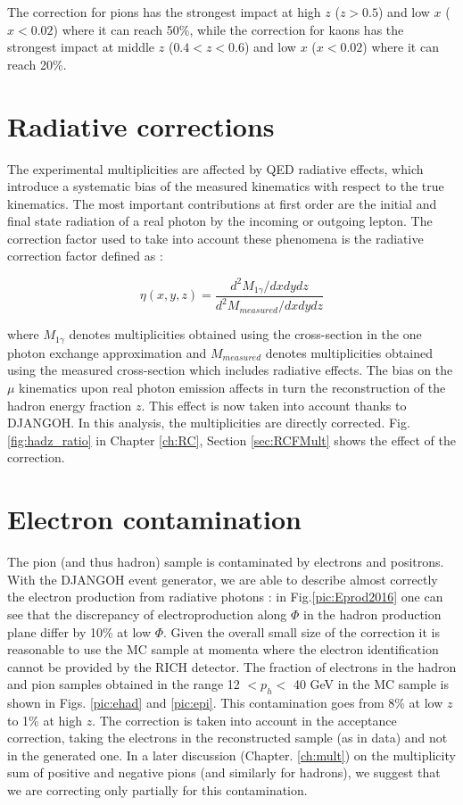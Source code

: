 The correction for pions has the strongest impact at high $z$ ($z>0.5$) and low $x$ ($x<0.02$) where it can reach 50\%, while the correction for kaons has the strongest impact at middle $z$ ($0.4<z<0.6$) and low $x$ ($x<0.02$) where it can reach 20\%.

\section{Radiative corrections} \label{sec:rcf}

The experimental multiplicities are affected by QED radiative effects, which introduce a systematic bias of the measured kinematics with respect to the true kinematics. The most important contributions at first order are the initial and final state radiation of a real photon by the incoming or outgoing lepton. The correction factor used to take into account these phenomena is the radiative correction factor defined as :

\begin{equation}
	\eta(x,y,z) = \frac{d^2 M_{1\gamma}/dxdydz}{d^2 M_{measured}/dxdydz}
\end{equation}

where $M_{1\gamma}$ denotes multiplicities obtained using the cross-section in the one photon exchange approximation and $M_{measured}$ denotes multiplicities obtained using the measured cross-section which includes radiative effects. The bias on the $\mu$ kinematics upon real photon emission affects in turn the reconstruction of the hadron energy fraction $z$. This effect is now taken into account thanks to DJANGOH. In this analysis, the multiplicities are directly corrected. Fig.\ref{fig:hadz_ratio} in Chapter \ref{ch:RC}, Section \ref{sec:RCFMult} shows the effect of the correction.

\section{Electron contamination}

The pion (and thus hadron) sample is contaminated by electrons and positrons. With the DJANGOH event generator, we are able to describe almost correctly the electron production from radiative photons : in Fig.\ref{pic:Eprod2016} one can see that the discrepancy of electroproduction along $\Phi$ in the hadron production plane differ by 10\% at low $\Phi$. Given the overall small size of the correction it is reasonable to use the MC sample at momenta where the electron identification cannot be provided by the RICH detector. The fraction of electrons in the hadron and pion samples obtained in the range 12 $< p_h <$ 40 GeV in the MC sample is shown in Figs. \ref{pic:ehad} and \ref{pic:epi}. This contamination goes from 8\% at low $z$ to 1\% at high $z$. The correction is taken into account in the acceptance correction, taking the electrons in the reconstructed sample (as in data) and not in the generated one. In a later discussion (Chapter. \ref{ch:mult}) on the multiplicity sum of positive and negative pions (and similarly for hadrons), we suggest that we are correcting only partially for this contamination.

